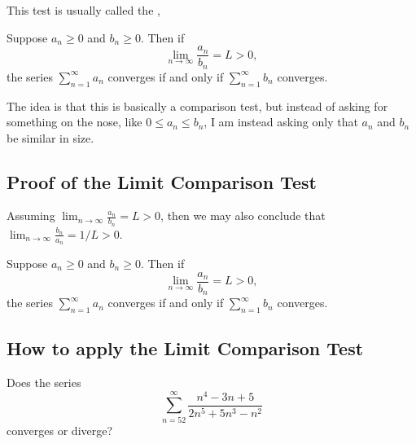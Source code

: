 This test is usually called the ,
\begin{theorem}
  \label{thm:limit-comparison-test}
  Suppose $a_n \geq 0$ and $b_n \geq 0$.  Then if
  $$
  \lim_{n \to \infty} \frac{a_n}{b_n} = L > 0,
  $$
  the series $\sum_{n=1}^\infty a_n$ converges if and only if
  $\sum_{n=1}^\infty b_n$ converges.
\end{theorem}

The idea is that this is basically a comparison test, but instead of
asking for something on the nose, like $0 \leq a_n \leq b_n$, I am
instead asking only that $a_n$ and $b_n$ be similar in size.

\subsection{Proof of the Limit Comparison Test}

Assuming $\lim_{n \to \infty} \frac{a_n}{b_n} = L > 0$, then we may also conclude that $\lim_{n \to \infty} \frac{b_n}{a_n} = 1/L > 0$.

\begin{theorem}
  \label{thm:limit-comparison-test}
  Suppose $a_n \geq 0$ and $b_n \geq 0$.  Then if
  $$
  \lim_{n \to \infty} \frac{a_n}{b_n} = L > 0,
  $$
  the series $\sum_{n=1}^\infty a_n$ converges if and only if
  $\sum_{n=1}^\infty b_n$ converges.
\end{theorem}

\subsection{How to apply the Limit Comparison Test}

\begin{example}
  Does the series
  $$
  \sum_{n=52}^\infty \frac{n^4 - 3n + 5}{2n^5 + 5n^3 - n^2}
  $$ converges or diverge?
\end{example}

